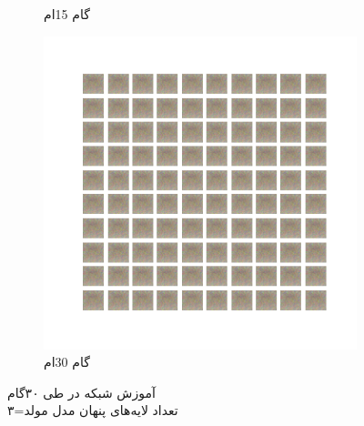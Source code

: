 \documentclass[12pt, a4paper]{book}
\begin{document}
\begin{figure}[h]
\begin{subfigure}{0.3\linewidth}
        \caption{گام 15ام}
    \end{subfigure}
    \begin{subfigure}{0.3\linewidth}
        \includegraphics[width=\linewidth]{images/fcgan/nlayer3/generated_img_30.png}
        \caption{گام 30ام}
    \end{subfigure}
    \caption{آموزش شبکه  در طی ۳۰گام\\ تعداد لایه‌های پنهان مدل مولد=۳}
    \label{fcgan_nlayer3}
\end{figure}
\end{document}
